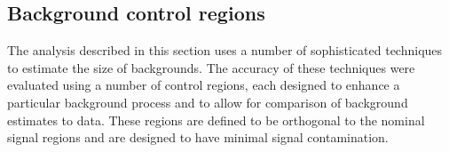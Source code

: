 


\subsection{Background control regions}

The analysis described in this section uses a number of sophisticated techniques to estimate the size of backgrounds.
The accuracy of these techniques were evaluated using a number of control regions, each designed to enhance a particular background process and to allow for comparison of background estimates to data.
These regions are defined to be orthogonal to the nominal signal regions and are designed to have minimal signal contamination.



